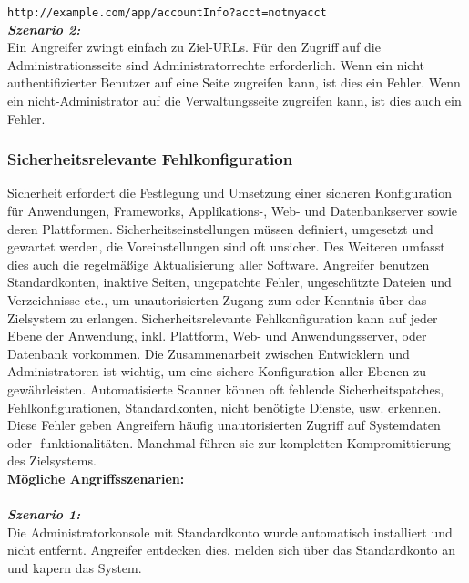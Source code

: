 \texttt{http://example.com/app/accountInfo?acct=notmyacct}\\

\textbf{\textit{Szenario 2:}}\\
Ein Angreifer zwingt einfach zu Ziel-URLs. Für den Zugriff auf die Administrationsseite sind Administratorrechte erforderlich. Wenn ein nicht authentifizierter Benutzer auf eine Seite zugreifen kann, ist dies ein Fehler. Wenn ein nicht-Administrator auf die Verwaltungsseite zugreifen kann, ist dies auch ein Fehler\cite[11]{owasp17top10}.

\subsubsection{Sicherheitsrelevante Fehlkonfiguration}

Sicherheit erfordert die Festlegung und Umsetzung einer sicheren Konfiguration für Anwendungen, Frameworks, Applikations-, Web- und Datenbankserver sowie deren Plattformen. Sicherheitseinstellungen müssen definiert, umgesetzt und gewartet werden, die Voreinstellungen sind oft unsicher. Des Weiteren umfasst dies auch die regelmäßige Aktualisierung aller Software\cite[6]{owasp17top10}. Angreifer benutzen Standardkonten, inaktive Seiten, ungepatchte Fehler, ungeschützte Dateien und Verzeichnisse etc., um unautorisierten Zugang zum oder Kenntnis
über das Zielsystem zu erlangen. Sicherheitsrelevante Fehlkonfiguration
kann auf jeder Ebene der Anwendung, inkl. Plattform, Web- und Anwendungsserver, oder Datenbank vorkommen. Die Zusammenarbeit zwischen Entwicklern und Administratoren ist wichtig, um eine sichere Konfiguration aller Ebenen zu gewährleisten. Automatisierte Scanner können oft fehlende Sicherheitspatches,
Fehlkonfigurationen, Standardkonten, nicht benötigte Dienste, usw. erkennen. Diese Fehler geben Angreifern häufig unautorisierten Zugriff auf Systemdaten oder -funktionalitäten. Manchmal führen sie zur kompletten Kompromittierung des Zielsystems\cite[12]{owasp17top10}.\\


\textbf{Mögliche Angriffsszenarien:}\\
\\
\textbf{\textit{Szenario 1:}}\\
Die Administratorkonsole mit Standardkonto
wurde automatisch installiert und nicht entfernt. Angreifer
entdecken dies, melden sich über das Standardkonto an und
kapern das System\cite[12]{owasp17top10}.\\

